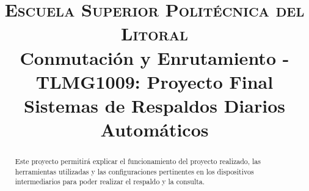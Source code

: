 \documentclass[conference]{IEEEtran}
\begin{document}
\title{
{\large \textsc{Escuela Superior Politécnica del Litoral}\\
Conmutación y Enrutamiento - TLMG1009: Proyecto Final
}\\
Sistemas de Respaldos Diarios Automáticos\\
}

\author{
\and
{}
\and
{}
\and
{}
\and
{}
}


\maketitle

\begin{abstract}
	Este proyecto permitirá explicar el funcionamiento del proyecto realizado, las herramientas utilizadas y las configuraciones pertinentes en los dispositivos intermediarios para poder realizar el respaldo y la consulta. 
\end{abstract}
\end{document}
